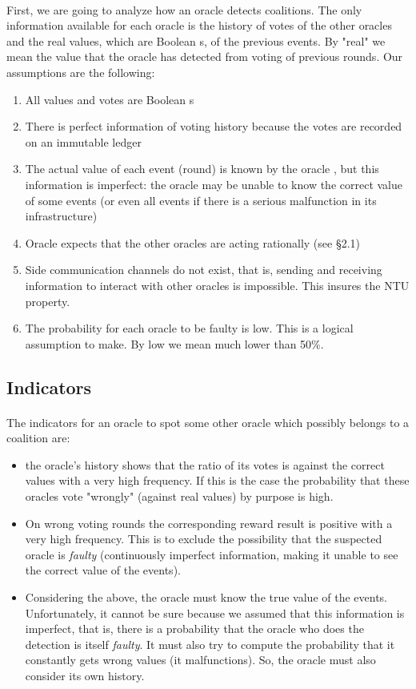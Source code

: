 \documentclass{article}
\begin{document}
\paragraph{ }
First, we are going to analyze how an oracle detects coalitions. The only information available for each oracle is the history of votes of the other oracles and the real values, which are Boolean s, of the previous events. By "real" we mean the value that the oracle has detected from voting of previous rounds. Our assumptions are the following:
\begin{enumerate}
\item All values and votes are Boolean s
\item There is perfect information of voting history because the votes are recorded on an immutable ledger
\item The actual value of each event (round) is known by the oracle , but this information is imperfect: the oracle may be unable to know the correct value of some events (or even all events if there is a serious malfunction in its infrastructure)  
\item Oracle expects that the other oracles are acting rationally (see §2.1)
\item Side communication channels do not exist, that is, sending and receiving information to interact with other oracles is impossible. This insures the NTU property.
\item The probability for each oracle to be faulty is low. This is a logical assumption to make. By low we mean much lower than 50\%.
\end{enumerate}

\subsection{Indicators}
\paragraph{ }
The indicators for an oracle to spot some other oracle which possibly belongs to a coalition are: 
\begin{itemize}
\item the oracle's history shows that the ratio of its votes is against the correct values with a very high frequency. If this is the case the probability that these oracles vote "wrongly" (against real values) by purpose is high.
\item On wrong voting rounds the corresponding reward result is positive with a very high frequency. This is to exclude the possibility that the suspected oracle is \emph{faulty} (continuously imperfect information, making it unable to see the correct value of the events).
\item Considering  the above, the oracle must know the true value of the events. Unfortunately, it cannot be sure because we assumed that this information is imperfect, that is, there is a probability that the oracle who does the detection is itself \emph{faulty}. It must also try to compute the probability that it constantly gets wrong values (it malfunctions). So, the oracle must also consider its own history.
\end{itemize}
\end{document}
